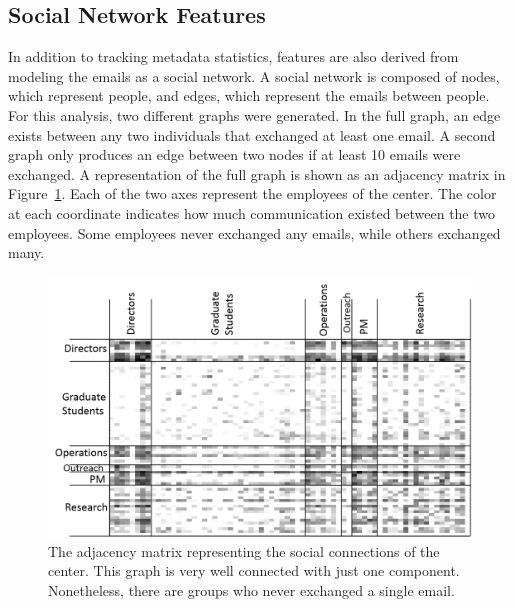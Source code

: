 \documentclass[10pt,twocolumn,conference]{IEEEtran}
\begin{document}
\subsection{Social Network Features}
In addition to tracking metadata statistics, features are also derived from modeling the emails as a social network.  A social network is composed of nodes, which represent people, and edges, which represent the emails between people.  For this analysis, two different graphs were generated.  In the full graph, an edge exists between any two individuals that exchanged at least one email.  A second graph only produces an edge between two nodes if at least 10 emails were exchanged.  A representation of the full graph is shown as an adjacency matrix in Figure~\ref{fig:adj_matrix}.  Each of the two axes represent the employees of the center.  The color at each coordinate indicates how much communication existed between the two employees.  Some employees never exchanged any emails, while others exchanged many.

\begin{figure}[t]
    \centering
    \includegraphics[width=\columnwidth,trim={4mm .5mm 0mm 5mm},clip]{adj_matrix}
    \vspace{-17pt}
    \caption{The adjacency matrix representing the social connections of the center.  This graph is very well connected with just one component.  Nonetheless, there are groups who never exchanged a single email.}
    \label{fig:adj_matrix}
\end{figure}
\end{document}
